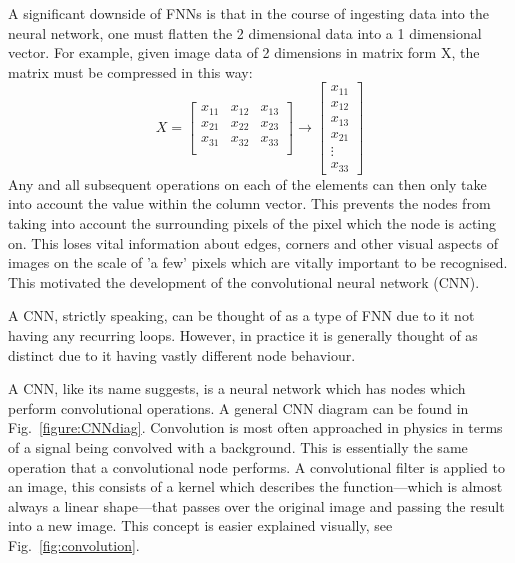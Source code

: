 \documentclass[a4paper,fleqn,usenatbib]{mnras}
\begin{document}
A significant downside of FNNs is that in the course of ingesting data into the neural network, one must flatten the 2 dimensional data into a 1 dimensional vector.
For example, given image data of 2 dimensions in matrix form X, the matrix must be compressed in this way:
\begin{equation}
	X=\begin{bmatrix}
           x_{11} & x_{12} & x_{13}\\
           x_{21} & x_{22} & x_{23}\\
           x_{31} & x_{32} & x_{33}\\
         \end{bmatrix}
         \rightarrow \begin{bmatrix}
           x_{11} \\ x_{12} \\ x_{13} \\
           x_{21} \\ \vdots \\ x_{33} 
         \end{bmatrix}
\end{equation}
Any and all subsequent operations on each of the elements can then only take into account the value within the column vector. This prevents the nodes from taking into account the surrounding pixels of the pixel which the node is acting on. This loses vital information about edges, corners and other visual aspects of images on the scale of 'a few' pixels which are vitally important to be recognised. This motivated the development of the convolutional neural network (CNN).

A CNN, strictly speaking, can be thought of as a type of FNN due to it not having any recurring loops. However, in practice it is generally thought of as distinct due to it having vastly different node behaviour. 


A CNN, like its name suggests, is a neural network which has nodes which perform convolutional operations. A general CNN diagram can be found in Fig.~\ref{figure:CNNdiag}. Convolution is most often approached in physics in terms of a signal being convolved with a background. This is essentially the same operation that a convolutional node performs. A convolutional filter is applied to an image, this consists of a kernel which describes the function---which is almost always a linear shape---that passes over the original image and passing the result into a new image. This concept is easier explained visually, see Fig.~\ref{fig:convolution}.
\end{document}
